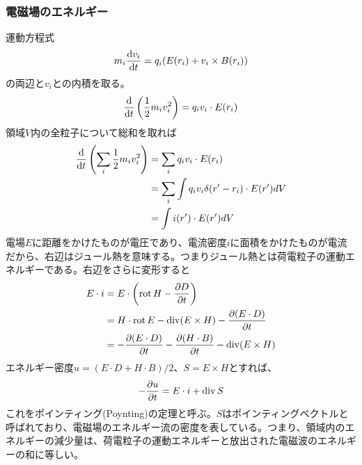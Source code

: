     \subsubsection{電磁場のエネルギー}
        運動方程式
            \[m_i\dv{v_i}{t} = q_i(E(r_i) + v_i \times B(r_i))\]
        の両辺と$v_i$との内積を取る。
            \[\dv{t}\left(\frac{1}{2}m_iv_i^2\right) = q_iv_i \cdot E(r_i)\]
        領域$V$内の全粒子について総和を取れば
        \begin{align*}
            \dv{t}\left(\sum_i \frac{1}{2}m_iv_i^2\right)
                &= \sum_i q_iv_i \cdot E(r_i)\\
                &= \sum_i \int q_iv_i\delta(r' - r_i) \cdot E(r') dV\\
                &= \int i(r') \cdot E(r') dV
        \end{align*}
        電場$E$に距離をかけたものが電圧であり、電流密度$i$に面積をかけたものが電流だから、右辺はジュール熱を意味する。つまりジュール熱とは荷電粒子の運動エネルギーである。右辺をさらに変形すると
        \begin{align*}
            E \cdot i
                &= E \cdot \left(\operatorname{rot} H - \pdv{D}{t}\right)\\
                &= H \cdot \operatorname{rot} E - \operatorname{div}(E \times H) - \pdv{(E \cdot D)}{t}\\
                &= -\pdv{(E \cdot D)}{t} - \pdv{(H \cdot B)}{t} - \operatorname{div}(E \times H)
        \end{align*}
        エネルギー密度$u = (E \cdot D + H \cdot B) / 2$、$S = E \times H$とすれば、
            \[-\pdv{u}{t} = E \cdot i + \operatorname{div} S\]
        これをポインティング(Poynting)の定理と呼ぶ。$S$はポインティングベクトルと呼ばれており、電磁場のエネルギー流の密度を表している。つまり、領域内のエネルギーの減少量は、荷電粒子の運動エネルギーと放出された電磁波のエネルギーの和に等しい。


